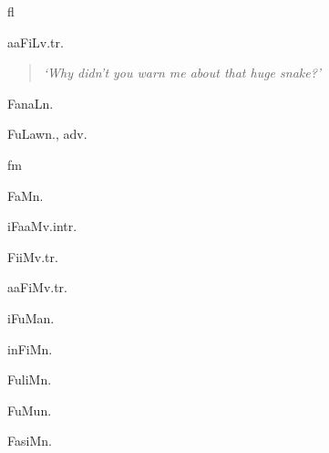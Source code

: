 \begin{multicols*}{2}
\begin{dictroot}{f}{l}
\begin{dictentry}{aaFiL}{v.tr.}
{\begin{quote}
                \textit{`Why didn't you warn me about that huge snake?'}
            \end{quote}
        }
    \end{dictentry}
    \begin{dictentry}{FanaL}{n.}
    \end{dictentry}
    \begin{dictentry}{FuLaw}{n., adv.}
    \end{dictentry}
\end{dictroot}

\begin{dictroot}{f}{m}
    \begin{dictentry}{FaM}{n.}
    \end{dictentry}
    \begin{dictentry}{iFaaM}{v.intr.}
    \end{dictentry}
    \begin{dictentry}{FiiM}{v.tr.}
    \end{dictentry}
    \begin{dictentry}{aaFiM}{v.tr.}
    \end{dictentry}
    \begin{dictentry}{iFuMa}{n.}
    \end{dictentry}
    \begin{dictentry}{inFiM}{n.}
    \end{dictentry}
    \begin{dictentry}{FuliM}{n.}
    \end{dictentry}
    \begin{dictentry}{FuMu}{n.}
    \end{dictentry}
    \begin{dictentry}{FasiM}{n.}
    \end{dictentry}

\end{dictroot}
\end{multicols*}
